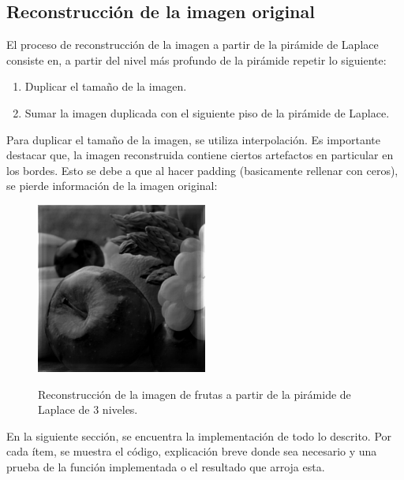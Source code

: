 \subsection{Reconstrucción de la imagen original}
El proceso de reconstrucción de la imagen a partir de la pirámide de Laplace consiste en, a partir del nivel más profundo de la pirámide repetir lo siguiente:
\begin{enumerate}
  \item Duplicar el tamaño de la imagen.
  \item Sumar la imagen duplicada con el siguiente piso de la pirámide de Laplace. 
\end{enumerate}

\par Para duplicar el tamaño de la imagen, se utiliza interpolación. Es importante destacar que, la imagen reconstruida contiene ciertos artefactos en particular en los bordes. Esto se debe a que al hacer padding (basicamente rellenar con ceros), se pierde información de la imagen original: 


\begin{figure}[H]
  \centering
  \includegraphics[width = 0.5\textwidth]{frutas_recons.png}  
  \label{fig:frutasRec}
  \caption{Reconstrucción de la imagen de frutas a partir de la pirámide de Laplace de 3 niveles.}
\end{figure}


\bigskip
\bigskip
\bigskip
\bigskip
\bigskip
\bigskip
\par En la siguiente sección, se encuentra la implementación de todo lo descrito.  Por cada ítem, se muestra el código, explicación breve donde sea necesario y una prueba de la función implementada o el resultado que arroja esta. 
 


